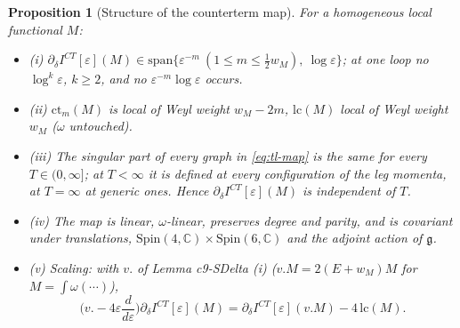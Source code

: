 \documentclass[11pt]{article}
\numberwithin{equation}{section}
\theoremstyle{plain}
\newtheorem{proposition}[theorem]{Proposition}
\theoremstyle{definition}
\begin{document}
\begin{proposition}[Structure of the counterterm map]
\label{prop:tl-map}
For a homogeneous local functional $M$:
\begin{itemize}
\item (i) $\partial_\delta I^{CT}[\varepsilon](M)\in\mathrm{span}\{\varepsilon^{-m}\ (1\le m\le\tfrac12w_M),\ \log\varepsilon\}$; at one loop no $\log^k\varepsilon$, $k\ge2$, and no $\varepsilon^{-m}\log\varepsilon$ occurs.
\item (ii) $\mathrm{ct}_m(M)$ is local of Weyl weight $w_M-2m$, $\mathrm{lc}(M)$ local of Weyl weight $w_M$ ($\omega$ untouched).
\item (iii) The singular part of every graph in \eqref{eq:tl-map} is the same for every $T\in(0,\infty]$; at $T<\infty$ it is defined at every configuration of the leg momenta, at $T=\infty$ at generic ones. Hence $\partial_\delta I^{CT}[\varepsilon](M)$ is independent of $T$.
\item (iv) The map is linear, $\omega$-linear, preserves degree and parity, and is covariant under translations, $\mathrm{Spin}(4,\mathbb C)\times\mathrm{Spin}(6,\mathbb C)$ and the adjoint action of $\mathfrak g$.
\item (v) Scaling: with $v.$ of Lemma c9-SDelta (i) ($v.M=2(E+w_M)M$ for $M=\int\omega(\cdots)$),
\begin{equation}
\Big(v.-4\varepsilon\frac{d}{d\varepsilon}\Big)\partial_\delta I^{CT}[\varepsilon](M)=\partial_\delta I^{CT}[\varepsilon](v.M)-4\,\mathrm{lc}(M).
\label{eq:tl-scaling}
\end{equation}
\end{itemize}
\end{proposition}
\end{document}
